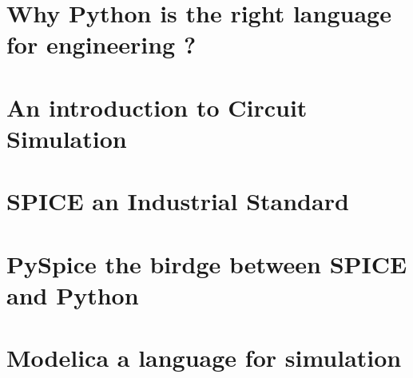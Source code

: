 \frame{%
\tableofcontents
\note{
}
}

%
%

\section{Why Python is the right language for engineering ?}

\section{An introduction to Circuit Simulation}


\section{SPICE an Industrial Standard}



\section{PySpice the birdge between SPICE and Python}


\section{Modelica a language for simulation}




